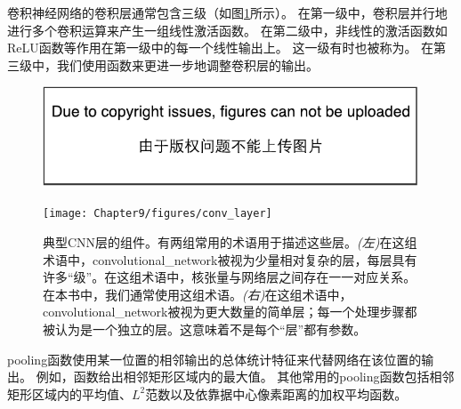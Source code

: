 卷积神经网络的卷积层通常包含三级（如图\ref{fig:chap9_conv_layer}所示）。
在第一级中，卷积层并行地进行多个卷积运算来产生一组线性激活函数。
在第二级中，非线性的激活函数如\gls{ReLU}函数等作用在第一级中的每一个线性输出上。
这一级有时也被称为。
在第三级中，我们使用函数来更进一步地调整卷积层的输出。
\begin{figure}[!htb]
\ifOpenSource
\centerline{\includegraphics{figure.pdf}}
\else
\centerline{\texttt{[image: Chapter9/figures/conv\_layer]}}
\fi
\caption{典型\gls{CNN}层的组件。有两组常用的术语用于描述这些层。\emph{(左)}在这组术语中，\gls{convolutional_network}被视为少量相对复杂的层，每层具有许多``级''。在这组术语中，核张量与网络层之间存在一一对应关系。在本书中，我们通常使用这组术语。\emph{(右)}在这组术语中，\gls{convolutional_network}被视为更大数量的简单层；每一个处理步骤都被认为是一个独立的层。这意味着不是每个``层''都有参数。}
\label{fig:chap9_conv_layer}
\end{figure}

\gls{pooling}函数使用某一位置的相邻输出的总体统计特征来代替网络在该位置的输出。
例如，函数\citep{zhou1988computation}给出相邻矩形区域内的最大值。
其他常用的\gls{pooling}函数包括相邻矩形区域内的平均值、$L^2$范数以及依靠据中心像素距离的加权平均函数。

 
